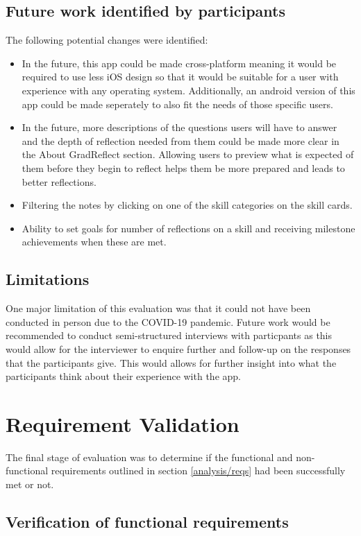 \documentclass{l4proj}
\begin{document}
\subsection{Future work identified by participants}
The following potential changes were identified:
\begin{itemize}
    \item In the future, this app could be made cross-platform meaning it would be required to use less iOS design so that it would be suitable for a user with experience with any operating system. Additionally, an android version of this app could be made seperately to also fit the needs of those specific users. 
    \item In the future, more descriptions of the questions users will have to answer and the depth of reflection needed from them could be made more clear in the About GradReflect section. Allowing users to preview what is expected of them before they begin to reflect helps them be more prepared and leads to better reflections.
    \item Filtering the notes by clicking on one of the skill categories on the skill cards.
    \item Ability to set goals for number of reflections on a skill and receiving milestone achievements when these are met.
\end{itemize}

\subsection{Limitations}
One major limitation of this evaluation was that it could not have been conducted in person due to the COVID-19 pandemic. Future work would be recommended to conduct semi-structured interviews with particpants as this would allow for the interviewer to enquire further and follow-up on the responses that the participants give. This would allows for further insight into what the participants think about their experience with the app.

\section{Requirement Validation}

The final stage of evaluation was to determine if the functional and non-functional requirements outlined in section \ref{analysis/reqs} had been successfully met or not. 

\subsection{Verification of functional requirements}
\end{document}
